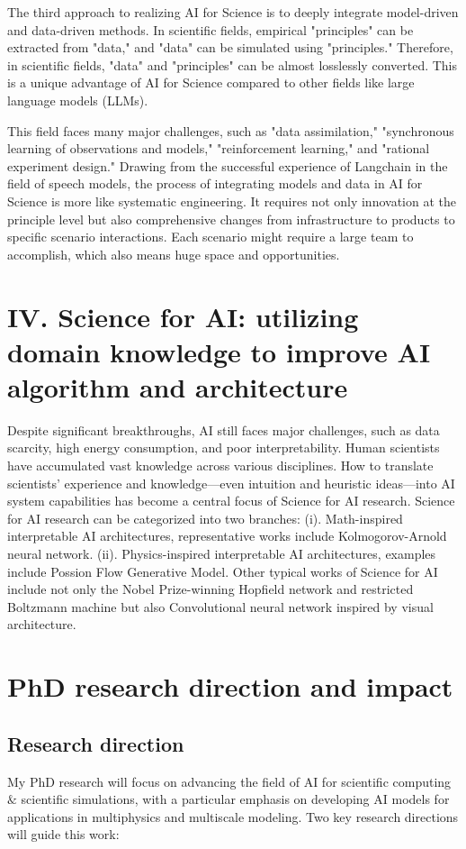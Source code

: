 The third approach to realizing AI for Science is to deeply integrate model-driven and data-driven methods. In scientific fields, empirical "principles" can be extracted from "data," and "data" can be simulated using "principles." Therefore, in scientific fields, "data" and "principles" can be almost losslessly converted. This is a unique advantage of AI for Science compared to other fields like large language models (LLMs).

This field faces many major challenges, such as "data assimilation," "synchronous learning of observations and models," "reinforcement learning," and "rational experiment design." Drawing from the successful experience of Langchain in the field of speech models, the process of integrating models and data in AI for Science is more like systematic engineering. It requires not only innovation at the principle level but also comprehensive changes from infrastructure to products to specific scenario interactions. Each scenario might require a large team to accomplish, which also means huge space and opportunities.

\section*{IV. Science for AI: utilizing domain knowledge to improve AI algorithm and architecture}

Despite significant breakthroughs, AI still faces major challenges, such as data scarcity, high energy consumption, and poor interpretability. Human scientists have accumulated vast knowledge across various disciplines. How to translate scientists' experience and knowledge—even intuition and heuristic ideas—into AI system capabilities has become a central focus of Science for AI research. Science for AI research can be categorized into two branches: (i). Math-inspired interpretable AI architectures, representative works include Kolmogorov-Arnold neural network. (ii). Physics-inspired interpretable AI architectures, examples include Possion Flow Generative Model. Other typical works of Science for AI include not only the Nobel Prize-winning Hopfield network and restricted Boltzmann machine but also Convolutional neural network inspired by visual architecture.

\section{PhD research direction and impact}

\subsection{Research direction}
My PhD research will focus on advancing the field of AI for scientific computing $\&$ scientific simulations, with a particular emphasis on developing AI models for applications in multiphysics and multiscale modeling. Two key research directions will guide this work:

